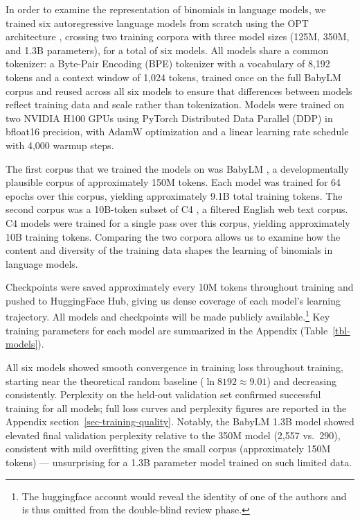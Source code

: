 \documentclass{article}
\begin{document}
In order to examine the representation of binomials in language models,
we trained six autoregressive language models from scratch using the OPT
architecture \citep{zhangOPTOpenPretrained2022}, crossing two training
corpora with three model sizes (125M, 350M, and 1.3B parameters), for a
total of six models. All models share a common tokenizer: a Byte-Pair
Encoding (BPE) tokenizer with a vocabulary of 8,192 tokens and a context
window of 1,024 tokens, trained once on the full BabyLM corpus and
reused across all six models to ensure that differences between models
reflect training data and scale rather than tokenization. Models were
trained on two NVIDIA H100 GPUs using PyTorch Distributed Data Parallel
(DDP) in bfloat16 precision, with AdamW optimization and a linear
learning rate schedule with 4,000 warmup steps.

The first corpus that we trained the models on was BabyLM \citep[Version
3,][]{charpentier2025babylmturns3}, a developmentally plausible corpus
of approximately 150M tokens. Each model was trained for 64 epochs over
this corpus, yielding approximately 9.1B total training tokens. The
second corpus was a 10B-token subset of C4
\citep{raffelExploringLimitsTransfer2020}, a filtered English web text
corpus. C4 models were trained for a single pass over this corpus,
yielding approximately 10B training tokens. Comparing the two corpora
allows us to examine how the content and diversity of the training data
shapes the learning of binomials in language models.

Checkpoints were saved approximately every 10M tokens throughout
training and pushed to HuggingFace Hub, giving us dense coverage of each
model's learning trajectory. All models and checkpoints will be made
publicly available.\footnote{The huggingface account would reveal the
  identity of one of the authors and is thus omitted from the
  double-blind review phase.} Key training parameters for each model are
summarized in the Appendix (Table~\ref{tbl-models}).

All six models showed smooth convergence in training loss throughout
training, starting near the theoretical random baseline
(\(\ln 8192 \approx 9.01\)) and decreasing consistently. Perplexity on
the held-out validation set confirmed successful training for all
models; full loss curves and perplexity figures are reported in the
Appendix section~\ref{sec-training-quality}. Notably, the BabyLM 1.3B
model showed elevated final validation perplexity relative to the 350M
model (2,557 vs.~290), consistent with mild overfitting given the small
corpus (approximately 150M tokens) --- unsurprising for a 1.3B parameter
model trained on such limited data.
\end{document}

